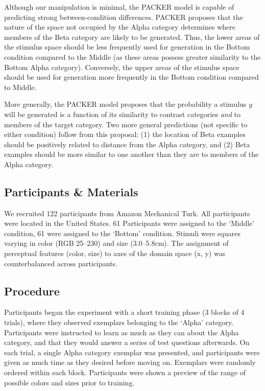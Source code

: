 \documentclass[10pt,letterpaper]{article}
\begin{document}
Although our manipulation is minimal, the PACKER model is capable of predicting strong between-condition differences. PACKER proposes that the nature of the space not occupied by the Alpha category determines where members of the Beta category are likely to be generated. Thus, the lower areas of the stimulus space should be less frequently used for generation in the Bottom condition compared to the Middle (as these areas possess greater similarity to the Bottom Alpha category). Conversely, the upper areas of the stimulus space should be used for generation more frequently in the Bottom condition compared to Middle.

More generally, the PACKER model proposes that the probability a stimulus $y$ will be generated is a function of its similarity to contrast categories \textit{and} to members of the target category. Two more general predictions (not specific to either condition) follow from this proposal: (1) the location of Beta examples should be positively related to distance from the Alpha category, and (2) Beta examples should be more similar to one another than they are to members of the Alpha category.

\subsection{Participants \& Materials}

We recruited 122 participants from Amazon Mechanical Turk. All participants were located in the United States. 61 Participants were assigned to the `Middle' condition, 61 were assigned to the `Bottom' condition. Stimuli were squares varying in color (RGB 25--230) and size (3.0--5.8cm). The assignment of perceptual features (color, size) to axes of the domain space (x, y) was counterbalanced across participants.

\subsection{Procedure}

Participants began the experiment with a short training phase (3 blocks of 4 trials), where they observed exemplars belonging to the `Alpha' category. Participants were instructed to learn as much as they can about the Alpha category, and that they would answer a series of test questions afterwards. On each trial, a single Alpha category exemplar was presented, and participants were given as much time as they desired before moving on. Exemplars were randomly ordered within each block. Participants were shown a preview of the range of possible colors and sizes prior to training.
\end{document}
